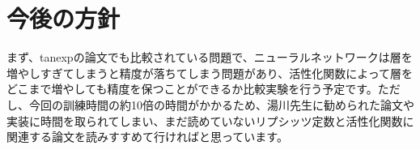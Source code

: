 \documentclass[12pt,a4j,draft]{jsarticle}
\begin{document}
\section{今後の方針}
まず、tanexpの論文でも比較されている問題で、ニューラルネットワークは層を増やしすぎてしまうと精度が落ちてしまう問題があり、活性化関数によって層をどこまで増やしても精度を保つことができるか比較実験を行う予定です。ただし、今回の訓練時間の約10倍の時間がかかるため、湯川先生に勧められた論文や実装に時間を取られてしまい、まだ読めていないリプシッツ定数と活性化関数に関連する論文を読みすすめて行ければと思っています。
\end{document}
